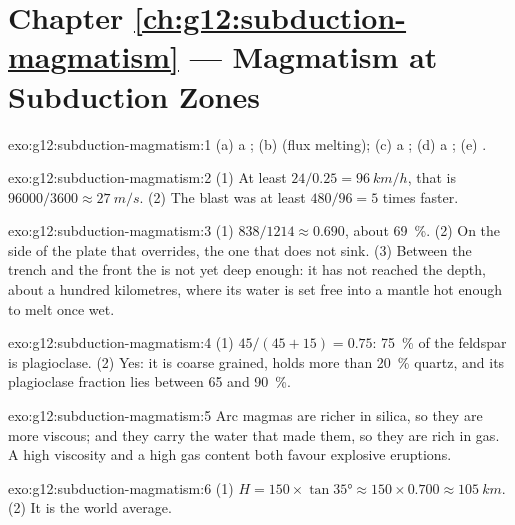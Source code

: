 \section*{Chapter \ref{ch:g12:subduction-magmatism} --- Magmatism at Subduction Zones}

\begin{solution}{exo:g12:subduction-magmatism:1}
(a) a ; (b)  (flux melting); (c) a ;
(d) a ; (e) .
\end{solution}

\begin{solution}{exo:g12:subduction-magmatism:2}
(1) At least $24/0.25 = \qty{96}{km/h}$, that is $\num{96000}/3600 \approx
\qty{27}{m/s}$. (2) The blast was at least $480/96 = 5$ times faster.
\end{solution}

\begin{solution}{exo:g12:subduction-magmatism:3}
(1) $838/1214 \approx 0.690$, about \qty{69}{\percent}. (2) On the side of
the plate that overrides, the one that does not sink. (3) Between the trench
and the front the  is not yet deep enough: it has not reached the depth,
about a hundred kilometres, where its water is set free into a mantle hot
enough to melt once wet.
\end{solution}

\begin{solution}{exo:g12:subduction-magmatism:4}
(1) $45/(45 + 15) = 0.75$: \qty{75}{\percent} of the feldspar is
plagioclase. (2) Yes: it is coarse grained, holds more than
\qty{20}{\percent} quartz, and its plagioclase fraction lies between 65 and
\qty{90}{\percent}.
\end{solution}

\begin{solution}{exo:g12:subduction-magmatism:5}
Arc magmas are richer in silica, so they are more viscous; and they carry
the water that made them, so they are rich in gas. A high viscosity and a
high gas content both favour explosive eruptions.
\end{solution}

\begin{solution}{exo:g12:subduction-magmatism:6}
(1) $H = 150 \times \tan\ang{35} \approx 150 \times 0.700 \approx
\qty{105}{km}$. (2) It is the world average.
\end{solution}

